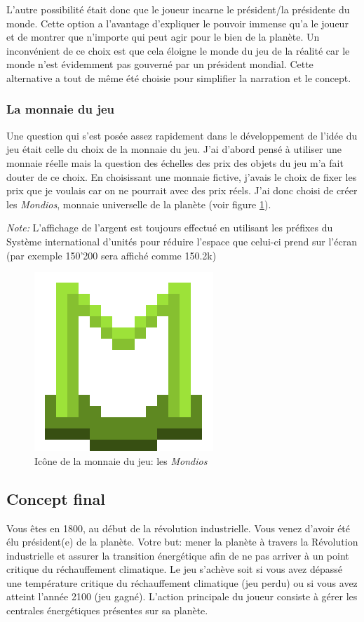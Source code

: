 \documentclass{article}
\begin{document}
        
        L'autre possibilité était donc que le joueur incarne le président/la présidente du monde. Cette option a l'avantage d'expliquer le pouvoir immense qu'a le joueur et de montrer que n'importe qui peut agir pour le bien de la planète.
        Un inconvénient de ce choix est que cela éloigne le monde du jeu de la réalité car le monde n'est évidemment pas gouverné par un président mondial. Cette alternative a tout de même été choisie pour simplifier la narration et le concept.
        

		\subsubsection{La monnaie du jeu}
		Une question qui s'est posée assez rapidement dans le développement de l'idée du jeu était celle du choix de la monnaie du jeu. J'ai d'abord pensé à utiliser une monnaie réelle mais la question des échelles des prix des objets du jeu m'a fait douter de ce choix. En choisissant une monnaie fictive, j'avais le choix de fixer les prix que je voulais car on ne pourrait avec des prix réels.
		J'ai donc choisi de créer les \textit{Mondios}, monnaie universelle de la planète (voir figure \ref{fig:mondiosLogo}).
		
		
		\textit{Note: }L'affichage de l'argent est toujours effectué en utilisant les préfixes du Système international d'unités pour réduire l'espace que celui-ci prend sur l'écran (par exemple 150'200 sera affiché comme 150.2k)
		\begin{figure}[H]
                \centerline{\includegraphics[scale=.5]{../images/mondiosLogo}}
                \caption{Icône de la monnaie du jeu: les \textit{Mondios}}
                \label{fig:mondiosLogo}
        \end{figure}		
		
        \subsection{Concept final}
        Vous êtes en 1800, au début de la révolution industrielle. Vous venez d'avoir été élu président(e) de la planète. Votre but: mener la planète à travers la Révolution industrielle et assurer la transition énergétique afin de ne pas arriver à un point critique du réchauffement climatique. Le jeu s'achève soit si vous avez dépassé une température critique du réchauffement climatique (jeu perdu) ou si vous avez atteint l'année 2100 (jeu gagné).
        L'action principale du joueur consiste à gérer les centrales énergétiques présentes sur sa planète.
\end{document}
